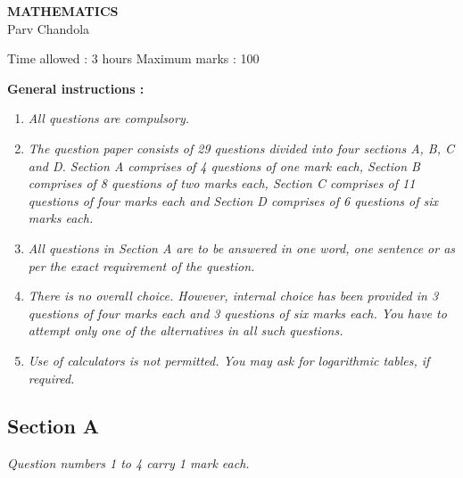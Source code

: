 \documentclass{exam}
\begin{document}
     \begin{center}
     \textbf{MATHEMATICS}\\
     Parv Chandola
     \vspace{8mm}
     \end{center}
     Time allowed : 3 hours \hspace{9cm} Maximum marks : 100\\
     
     \begin{flushleft}
     \textbf{General instructions : }\\
     \end{flushleft}
     
     \begin{enumerate}
     \item \textit{All questions are compulsory.}
     
     \item \textit{The question paper consists of 29 questions divided into four sections A, B, C and D. Section A comprises of 4 questions of one mark each, Section B comprises of 8 questions of two marks each, Section C comprises of 11 questions of four marks each and Section D comprises of 6 questions of six marks each.}
     
     \item \textit{All questions in Section A are to be answered in one word, one sentence or as per the exact requirement of the question.}
     
     \item \textit{There is no overall choice. However, internal choice has been provided in 3 questions of four marks each and 3 questions of six marks each. You have to attempt only one of the alternatives in all such questions.}
     
     \item \textit{Use of calculators is not permitted. You may ask for logarithmic tables, if required.}
     \end{enumerate}
     
     \vspace{1mm}
     
     \begin{center}
     \section*{Section A}
     \end{center}
     
     \begin{flushleft}
      \textit{ Question numbers 1 to 4 carry 1 mark each.}
     \end{flushleft}
    
\end{document}
